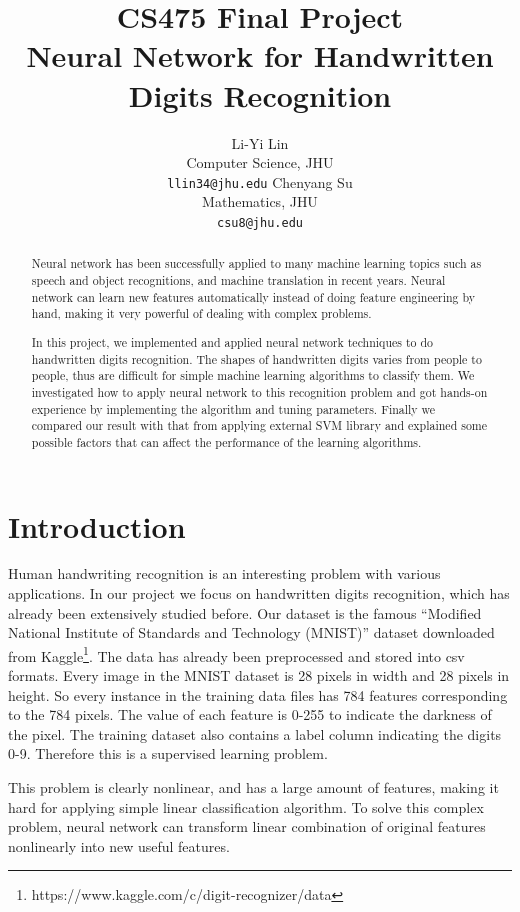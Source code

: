 \documentclass[11pt,letterpaper]{article}
\title{CS475 Final Project\\Neural Network for Handwritten Digits Recognition}
\author{Li-Yi Lin\\
  Computer Science, JHU\\
  {\tt llin34@jhu.edu}
  \And
  Chenyang Su \\
  Mathematics, JHU\\
  {\tt csu8@jhu.edu}}
\date{}
\begin{document}
\maketitle
\begin{abstract}
Neural network has been successfully applied to many machine learning topics such as speech and object recognitions, and machine translation in recent years. Neural network can learn new features automatically instead of doing feature engineering by hand, making it very powerful of dealing with complex problems.
          
In this project, we implemented and applied neural network techniques to do handwritten digits recognition. The shapes of handwritten digits varies from people to people, thus are difficult for simple machine learning algorithms to classify them. We investigated how to apply neural network to this recognition problem and got hands-on experience by implementing the algorithm and tuning parameters. Finally we compared our result with that from applying external SVM library and explained some possible factors that can affect the performance of the learning algorithms.
\end{abstract}

\section{Introduction}

Human handwriting recognition is an interesting problem with various applications. In our project we focus on handwritten digits recognition, which has already been extensively studied before. Our dataset is the famous “Modified National Institute of Standards and Technology (MNIST)” dataset downloaded from Kaggle\footnote{https://www.kaggle.com/c/digit-recognizer/data}. The data has already been preprocessed and stored into csv formats. Every image in the MNIST dataset is 28 pixels in width and 28 pixels in height. So every instance in the training data files has 784 features corresponding to the 784 pixels. The value of each feature is 0-255 to indicate the darkness of the pixel. The training dataset also contains a label column indicating the digits 0-9. Therefore this is a supervised learning problem. 

This problem is clearly nonlinear, and has a large amount of features, making it hard for  applying simple linear classification algorithm. To solve this complex problem, neural network can transform linear combination of original features nonlinearly into new useful features. 
\end{document}
